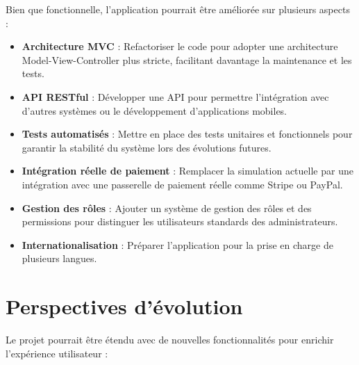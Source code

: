 \documentclass[12pt,a4paper]{report}
\begin{document}
Bien que fonctionnelle, l'application pourrait être améliorée sur plusieurs aspects :

\begin{itemize}
    \item \textbf{Architecture MVC} : Refactoriser le code pour adopter une architecture Model-View-Controller plus stricte, facilitant davantage la maintenance et les tests.
    
    \item \textbf{API RESTful} : Développer une API pour permettre l'intégration avec d'autres systèmes ou le développement d'applications mobiles.
    
    \item \textbf{Tests automatisés} : Mettre en place des tests unitaires et fonctionnels pour garantir la stabilité du système lors des évolutions futures.
    
    \item \textbf{Intégration réelle de paiement} : Remplacer la simulation actuelle par une intégration avec une passerelle de paiement réelle comme Stripe ou PayPal.
    
    \item \textbf{Gestion des rôles} : Ajouter un système de gestion des rôles et des permissions pour distinguer les utilisateurs standards des administrateurs.
    
    \item \textbf{Internationalisation} : Préparer l'application pour la prise en charge de plusieurs langues.
\end{itemize}

\section{Perspectives d'évolution}

Le projet pourrait être étendu avec de nouvelles fonctionnalités pour enrichir l'expérience utilisateur :
\end{document}
